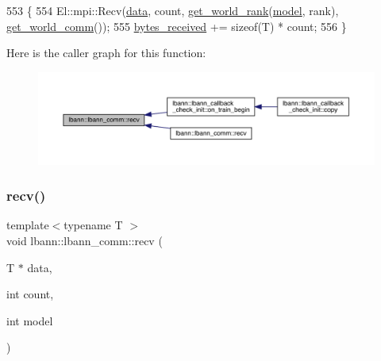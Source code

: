 \begin{DoxyCode}
553                                                                            \{
554     El::mpi::Recv(\hyperlink{namespacelbann_1_1cnpy__utils_a9ac86d96ccb1f8b4b2ea16441738781f}{data}, count, \hyperlink{classlbann_1_1lbann__comm_ab3b1ebe8b72575094405eb2e37bb447d}{get\_world\_rank}(\hyperlink{namespacelbann_adee41f31f15f3906cbdcce4a1417eb56a20f35e630daf44dbfa4c3f68f5399d8c}{model}, rank), 
      \hyperlink{classlbann_1_1lbann__comm_a0493f1f0c42b95674daacf5288fdb073}{get\_world\_comm}());
555     \hyperlink{classlbann_1_1lbann__comm_afb99f57f7eafc0695bf28e6c26a8120f}{bytes\_received} += \textcolor{keyword}{sizeof}(T) * count;
556   \}
\end{DoxyCode}
Here is the caller graph for this function\+:\nopagebreak
\begin{figure}[H]
\begin{center}
\leavevmode
\includegraphics[width=350pt]{classlbann_1_1lbann__comm_af8842cd4cea390f76d9146e1c4578de4_icgraph}
\end{center}
\end{figure}
\mbox{\label{classlbann_1_1lbann__comm_a7f2f06772bdee76b4d736c1d7ab84329}} 
\subsubsection{\texorpdfstring{recv()}{recv()}\hspace{0.1cm}{\footnotesize\ttfamily [2/9]}}
{\footnotesize\ttfamily template$<$typename T $>$ \\
void lbann\+::lbann\+\_\+comm\+::recv (\begin{DoxyParamCaption}\item[{T $\ast$}]{data,  }\item[{int}]{count,  }\item[{int}]{model }\end{DoxyParamCaption})\hspace{0.3cm}{\ttfamily [inline]}}




